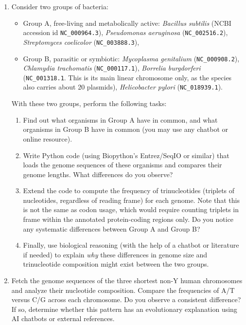\begin{enumerate}
\item Consider two groups of bacteria: 
\begin{itemize}
\item Group A, free-living and metabolically active: \textit{Bacillus subtilis} (NCBI accession id \texttt{NC\_000964.3}), \textit{Pseudomonas aeruginosa} (\texttt{NC\_002516.2}), \textit{Streptomyces coelicolor} (\texttt{NC\_003888.3}),
\item Group B, parasitic or symbiotic: \textit{Mycoplasma genitalium} (\texttt{NC\_000908.2}), \textit{Chlamydia trachomatis} (\texttt{NC\_000117.1}), \textit{Borrelia burgdorferi} (\texttt{NC\_001318.1}. This is its main linear chromosome only, as the species also carries about 20 plasmids), \textit{Helicobacter pylori} (\texttt{NC\_018939.1}).
\end{itemize}
With these two groups, perform the following tasks:
\begin{enumerate}
\item Find out what organisms in Group A have in common, and what organisms in Group B have in common (you may use any chatbot or online resource).
\item Write Python code (using Biopython's Entrez/SeqIO or similar) that loads the genome sequences of these organisms and compares their genome lengths. What differences do you observe?
\item Extend the code to compute the frequency of trinucleotides (triplets of nucleotides, regardless of reading frame) for each genome. Note that this is not the same as codon usage, which would require counting triplets in frame within the annotated protein-coding regions only. Do you notice any systematic differences between Group A and Group B?
\item Finally, use biological reasoning (with the help of a chatbot or literature if needed) to explain \textit{why} these differences in genome size and trinucleotide composition might exist between the two groups.
\end{enumerate}

\item Fetch the genome sequences of the three shortest non-Y human chromosomes and analyze their nucleotide composition. Compare the frequencies of A/T versus C/G across each chromosome. Do you observe a consistent difference? If so, determine whether this pattern has an evolutionary explanation using AI chatbots or external references.


\end{enumerate}
